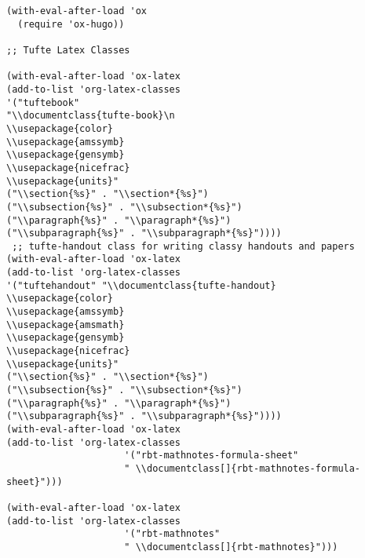 \documentclass[11pt]{article}
\begin{document}
\begin{verbatim}
(with-eval-after-load 'ox
  (require 'ox-hugo))

;; Tufte Latex Classes

(with-eval-after-load 'ox-latex
(add-to-list 'org-latex-classes
'("tuftebook"
"\\documentclass{tufte-book}\n
\\usepackage{color}
\\usepackage{amssymb}
\\usepackage{gensymb}
\\usepackage{nicefrac}
\\usepackage{units}"
("\\section{%s}" . "\\section*{%s}")
("\\subsection{%s}" . "\\subsection*{%s}")
("\\paragraph{%s}" . "\\paragraph*{%s}")
("\\subparagraph{%s}" . "\\subparagraph*{%s}"))))
 ;; tufte-handout class for writing classy handouts and papers
(with-eval-after-load 'ox-latex
(add-to-list 'org-latex-classes
'("tuftehandout" "\\documentclass{tufte-handout}
\\usepackage{color}
\\usepackage{amssymb}
\\usepackage{amsmath}
\\usepackage{gensymb}
\\usepackage{nicefrac}
\\usepackage{units}"
("\\section{%s}" . "\\section*{%s}")
("\\subsection{%s}" . "\\subsection*{%s}")
("\\paragraph{%s}" . "\\paragraph*{%s}")
("\\subparagraph{%s}" . "\\subparagraph*{%s}"))))
(with-eval-after-load 'ox-latex
(add-to-list 'org-latex-classes
                     '("rbt-mathnotes-formula-sheet"
                     " \\documentclass[]{rbt-mathnotes-formula-sheet}")))

(with-eval-after-load 'ox-latex
(add-to-list 'org-latex-classes
                     '("rbt-mathnotes"
                     " \\documentclass[]{rbt-mathnotes}")))


\end{verbatim}
\end{document}
